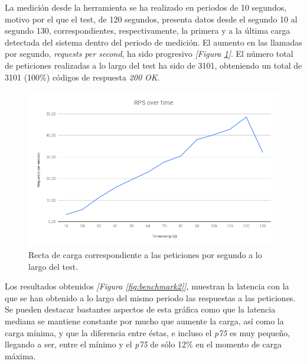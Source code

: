 \documentclass[11pt,spanish,listoffigures]{tfgetsinf}
\begin{document}
La medición desde la herramienta se ha realizado en periodos de 10 segundos, motivo por el que el test, de 120 segundos, presenta datos desde el segundo 10 al segundo 130, correspondientes, respectivamente, la primera y a la última carga detectada del sistema dentro del periodo de medición. El aumento en las llamadas por segundo, \textit{requests per second}, ha sido progresivo \textit{[Figura \ref{fig:benchmark1}]}. El número total de peticiones realizadas a lo largo del test ha sido de 3101, obteniendo un total de 3101 (100\%) códigos de respuesta \textit{200 OK}.

\begin{figure}[h!]
    \centering
    \includegraphics[width=1\textwidth]{images/img23.png}
    \caption{Recta de carga correspondiente a las peticiones por segundo a lo largo del test.}
    \label{fig:benchmark1}
\end{figure}

Los resultados obtenidos \textit{[Figura \ref{fig:benchmark2}]}, muestran la latencia con la que se han obtenido a lo largo del mismo periodo las respuestas a las peticiones. Se pueden destacar bastantes aspectos de esta gráfica como que la latencia mediana se mantiene constante por mucho que aumente la carga, así como la carga mínima, y que la diferencia entre éstas, e incluso el \textit{p75} es muy pequeño, llegando a ser, entre el mínimo y el \textit{p75} de sólo 12\% en el momento de carga máxima.
\end{document}
